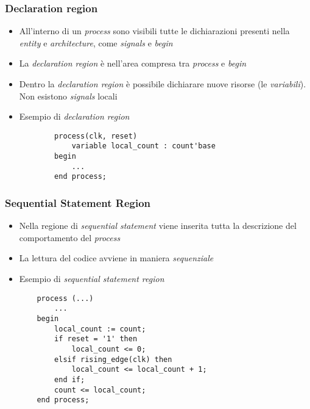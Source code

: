 \documentclass{article}
\begin{document}
\subsubsection{Declaration region}
\begin{itemize}
	\item All'interno di un \textit{process} sono visibili tutte le dichiarazioni presenti nella \textit{entity} e \textit{architecture}, come \textit{signals} e \textit{begin}
	\item La \textit{declaration region} è nell'area compresa tra \textit{process} e \textit{begin}
	\item Dentro la \textit{declaration region} è possibile dichiarare nuove risorse (le \textit{variabili}). Non esistono \textit{signals} locali
	\item Esempio di \textit{declaration region}
	      \begin{verbatim}
	    process(clk, reset)
	        variable local_count : count'base
	    begin
        	...
	    end process;
	      \end{verbatim}
\end{itemize}
\subsubsection{Sequential Statement Region}
\begin{itemize}
	\item Nella regione di \textit{sequential statement} viene inserita tutta la descrizione del comportamento del \textit{process}
	\item La lettura del codice avviene in maniera \textit{sequenziale}
	
	\newpage
	
	\item Esempio di \textit{sequential statement region}
		\begin{verbatim}
    process (...)
        ...
    begin
        local_count := count;
        if reset = '1' then
            local_count <= 0;
        elsif rising_edge(clk) then
            local_count <= local_count + 1;
        end if;
        count <= local_count;
    end process;
	      \end{verbatim}
\end{itemize}
\end{document}

